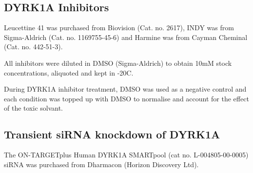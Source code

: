 \documentclass[onecolumn,10pt]{asme2ej}
\begin{document}
\subsection{DYRK1A Inhibitors}
Leucettine 41 was purchased from Biovision (Cat. no. 2617), INDY was from Sigma-Aldrich (Cat. no. 1169755-45-6) and Harmine was from Cayman Cheminal (Cat. no. 442-51-3).

All inhibitors were diluted in DMSO (Sigma-Aldrich) to obtain 10mM stock concentrations, aliquoted and kept in -20C.

During DYRK1A inhibitor treatment, DMSO was used as a negative control and each condition was topped up with DMSO to normalise and account for the effect of the toxic solvant.                                          




\subsection{Transient siRNA knockdown of DYRK1A}

The ON-TARGETplus Human DYRK1A SMARTpool (cat no. L-004805-00-0005) siRNA was purchased from  Dharmacon (Horizon Discovery Ltd).
\end{document}
